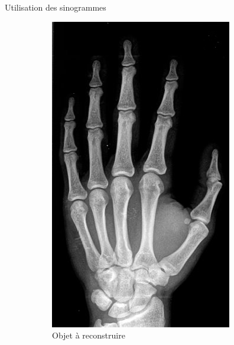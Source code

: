 \documentclass{beamer}
\begin{document}
\begin{frame}{Utilisation des sinogrammes}
    \begin{figure}[t]
        \centering
        \begin{subfigure}[b]{0.35\textwidth}
            \includegraphics[width=\textwidth]{radio_main.jpeg}
            \caption{Objet à reconstruire}
        \end{subfigure}
        \pause
        \qquad \qquad 
        \begin{subfigure}[b]{0.22\textwidth}

\end{subfigure}
\end{figure}
\end{frame}
\end{document}
